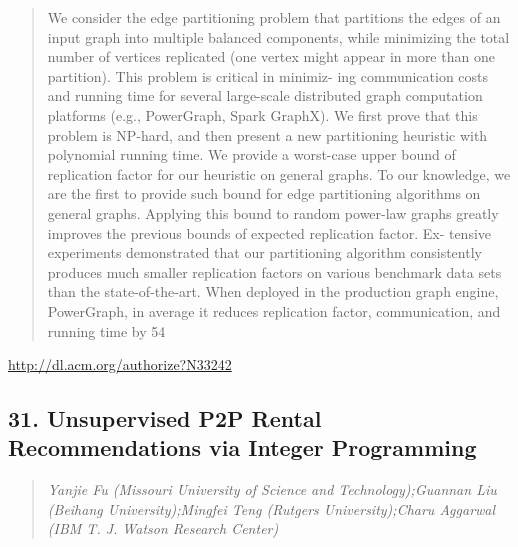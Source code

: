 \documentclass{article}
\begin{document}
\begin{quote}
We consider the edge partitioning problem that partitions the edges of an input graph into multiple balanced components, while minimizing the total number of vertices replicated (one vertex might appear in more than one partition). This problem is critical in minimiz- ing communication costs and running time for several large-scale distributed graph computation platforms (e.g., PowerGraph, Spark GraphX). We first prove that this problem is NP-hard, and then present a new partitioning heuristic with polynomial running time. We provide a worst-case upper bound of replication factor for our heuristic on general graphs. To our knowledge, we are the first to provide such bound for edge partitioning algorithms on general graphs. Applying this bound to random power-law graphs greatly improves the previous bounds of expected replication factor. Ex- tensive experiments demonstrated that our partitioning algorithm consistently produces much smaller replication factors on various benchmark data sets than the state-of-the-art. When deployed in the production graph engine, PowerGraph, in average it reduces replication factor, communication, and running time by 54%
\end{quote}

\href{http://dl.acm.org/authorize?N33242}{http://dl.acm.org/authorize?N33242}

\subsection{31. Unsupervised P2P Rental Recommendations via Integer Programming}

\begin{quote}
\footnotesize{\textit{Yanjie Fu (Missouri University of Science and Technology);Guannan Liu (Beihang University);Mingfei Teng (Rutgers University);Charu Aggarwal (IBM T. J. Watson Research Center)}}

\end{quote}
\end{document}
